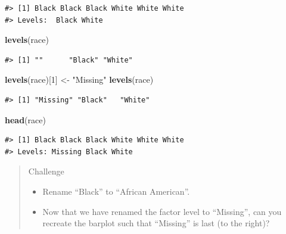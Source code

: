 \documentclass[
]{book}
\newenvironment{Shaded}{\begin{snugshade}}{\end{snugshade}}
\newcommand{\DecValTok}[1]{\textcolor[rgb]{0.00,0.00,0.81}{#1}}
\newcommand{\KeywordTok}[1]{\textcolor[rgb]{0.13,0.29,0.53}{\textbf{#1}}}
\newcommand{\NormalTok}[1]{#1}
\newcommand{\OperatorTok}[1]{\textcolor[rgb]{0.81,0.36,0.00}{\textbf{#1}}}
\newcommand{\StringTok}[1]{\textcolor[rgb]{0.31,0.60,0.02}{#1}}
\providecommand{\tightlist}{%
  \setlength{\itemsep}{0pt}\setlength{\parskip}{0pt}}
\begin{document}
\begin{Shaded}
\end{Shaded}

\begin{verbatim}
#> [1] Black Black Black White White White
#> Levels:  Black White
\end{verbatim}

\begin{Shaded}
\begin{Highlighting}[]
\KeywordTok{levels}\NormalTok{(race)}
\end{Highlighting}
\end{Shaded}

\begin{verbatim}
#> [1] ""      "Black" "White"
\end{verbatim}

\begin{Shaded}
\begin{Highlighting}[]
\KeywordTok{levels}\NormalTok{(race)[}\DecValTok{1}\NormalTok{] <-}\StringTok{ "Missing"}
\KeywordTok{levels}\NormalTok{(race)}
\end{Highlighting}
\end{Shaded}

\begin{verbatim}
#> [1] "Missing" "Black"   "White"
\end{verbatim}

\begin{Shaded}
\begin{Highlighting}[]
\KeywordTok{head}\NormalTok{(race)}
\end{Highlighting}
\end{Shaded}

\begin{verbatim}
#> [1] Black Black Black White White White
#> Levels: Missing Black White
\end{verbatim}

\begin{quote}
Challenge

\begin{itemize}
\tightlist
\item
  Rename ``Black'' to ``African American''.
\item
  Now that we have renamed the factor level to ``Missing'', can you recreate the
  barplot such that ``Missing'' is last (to the right)?
\end{itemize}
\end{quote}
\end{document}
